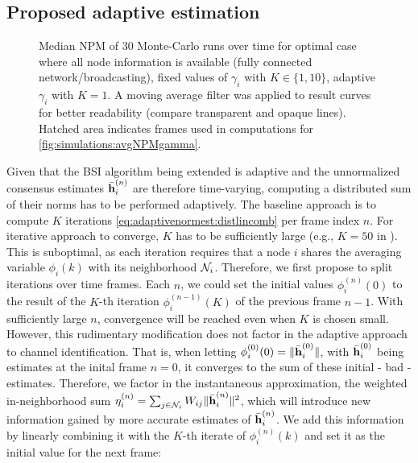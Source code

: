 \documentclass{article}
\begin{document}
\subsection[]{Proposed adaptive estimation}
\begin{figure}[t]
    \centering
    
    \vspace*{-0.6cm}
    \caption[]{Median NPM of 30 Monte-Carlo runs over time for optimal case where all node information is available (fully connected network/broadcasting), fixed values of \(\gamma_i\) with \(K \in \{1,10\}\), adaptive \(\gamma_i\) with \(K=1\). A moving average filter was applied to result curves for better readability (compare transparent and opaque lines). Hatched area indicates frames used in computations for \autoref{fig:simulations:avgNPMgamma}.}
    \label{fig:simulations:NPMtime}
\end{figure}
Given that the BSI algorithm being extended \cite{blochbergerDBSI} is adaptive and the unnormalized consensus estimates \(\bar{\bm{\mathrm{h}}}_i^{(n)}\) are therefore time-varying, computing a distributed sum of their norms has to be performed adaptively.
The baseline approach is to compute \(K\) iterations \eqref{eq:adaptivenormest:distlincomb} per frame index \(n\).
For iterative approach to converge, \(K\) has to be sufficiently large (e.g., \(K=50\) in \cite{yuDistributedBlindSystem2014,liuDistributedBlindIdentification2016}).
This is suboptimal, as each iteration requires that a node \(i\) shares the averaging variable \(\phi_i(k)\) with its neighborhood \(\mathcal{N}_i\).
Therefore, we first propose to split iterations over time frames.
Each \(n\), we could set the initial values \(\phi_i^{(n)}(0)\) to the result of the \(K\)-th iteration \(\phi_i^{(n-1)}(K)\) of the previous frame \(n-1\).
With sufficiently large \(n\), convergence will be reached even when \(K\) is chosen small.
However, this rudimentary modification does not factor in the adaptive approach to channel identification.
That is, when letting \(\phi_i^{(0)}(0) = \|\bar{\bm{\mathrm{h}}}_i^{(0)}\|\), with \(\bar{\bm{\mathrm{h}}}_i^{(0)}\) being estimates at the inital frame \(n=0\), it converges to the sum of these initial - bad - estimates.
Therefore, we factor in the instantaneous approximation, the weighted in-neighborhood sum \(\eta_i^{(n)} = \sum_{j \in \mathcal{N}_i} W_{ij} \|\bar{\bm{\mathrm{h}}}_i^{(n)}\|^2\), which will introduce new information gained by more accurate estimates of \(\bar{\bm{\mathrm{h}}}_i^{(n)}\).
We add this information by linearly combining it with the \(K\)-th iterate of \(\phi_i^{(n)}(k)\) and set it as the initial value for the next frame:
\end{document}
